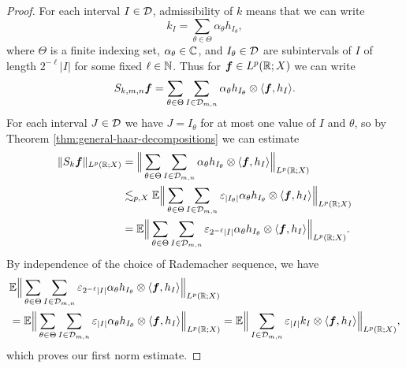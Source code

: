 \begin{proof}
  For each interval $I \in \mathcal{D}$, admissibility of $k$ means that we can write
  \begin{equation*}
    k_{I} = \sum_{\theta \in \Theta} \alpha_{\theta} h_{I_{\theta}},
  \end{equation*}
  where $\Theta$ is a finite indexing set, $\alpha_{\theta} \in \mathbb{C}$, and $I_{\theta} \in \mathcal{D}$ are subintervals of $I$ of length $2^{-\ell}|I|$ for some fixed $\ell \in \mathbb{N}$.
  Thus for $\bm{f} \in L^p(\mathbb{R};X)$ we can write
  \begin{equation*}
    \begin{aligned}
      S_{k,m,n}\bm{f} = \sum_{\theta \in \Theta}  \sum_{I \in \mathcal{D}_{m,n}} \alpha_{\theta} h_{I_{\theta}} \otimes \langle \bm{f}, h_{I} \rangle .
    \end{aligned}
  \end{equation*}
  For each interval $J \in \mathcal{D}$ we have $J = I_{\theta}$ for at most one value of $I$ and $\theta$, so by Theorem \ref{thm:general-haar-decompositions} we can estimate
  \begin{equation*}
    \begin{aligned}
      \|S_{k} \bm{f}\|_{L^p(\mathbb{R};X)}
      &= \Big\| \sum_{\theta \in \Theta} \sum_{I \in \mathcal{D}_{m,n}} \alpha_{\theta} h_{I_{\theta}} \otimes \langle \bm{f}, h_{I} \rangle \Big\|_{L^p(\mathbb{R};X)} \\
      &\lesssim_{p,X} \mathbb{E} \Big\| \sum_{\theta \in \Theta} \sum_{I \in \mathcal{D}_{m,n}} \varepsilon_{|I_{\theta}|} \alpha_{\theta} h_{I_{\theta}} \otimes \langle \bm{f}, h_{I} \rangle \Big\|_{L^p(\mathbb{R};X)} \\
      &= \mathbb{E} \Big\| \sum_{\theta \in \Theta} \sum_{I \in \mathcal{D}_{m,n}} \varepsilon_{2^{-\ell}|I|} \alpha_{\theta} h_{I_{\theta}} \otimes \langle \bm{f}, h_{I} \rangle \Big\|_{L^p(\mathbb{R};X)}.
    \end{aligned}
   \end{equation*}
   By independence of the choice of Rademacher sequence, we have
   \begin{equation*}
     \begin{aligned}
       &\mathbb{E} \Big\| \sum_{\theta \in \Theta} \sum_{I \in \mathcal{D}_{m,n}} \varepsilon_{2^{-\ell}|I|} \alpha_{\theta}  h_{I_{\theta}} \otimes \langle \bm{f}, h_{I} \rangle \Big\|_{L^p(\mathbb{R};X)} \\
       &= \mathbb{E} \Big\| \sum_{\theta \in \Theta} \sum_{I \in \mathcal{D}_{m,n}} \varepsilon_{|I|} \alpha_{\theta} h_{I_{\theta}} \otimes \langle \bm{f}, h_{I} \rangle \Big\|_{L^p(\mathbb{R};X)}
       = \mathbb{E} \Big\| \sum_{I \in \mathcal{D}_{m,n}} \varepsilon_{|I|} k_{I} \otimes \langle \bm{f}, h_{I} \rangle \Big\|_{L^p(\mathbb{R};X)},
     \end{aligned}
   \end{equation*}
   which proves our first norm estimate.


\end{proof}
